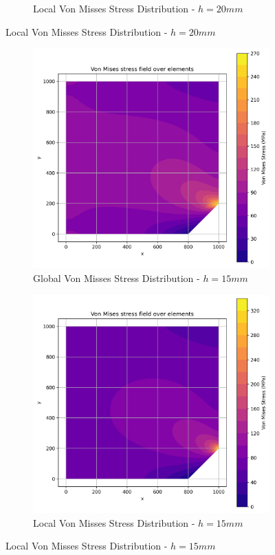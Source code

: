 \begin{figure}[H]
\begin{subfigure}[b]{0.45\textwidth}
    \caption{Local Von Misses Stress Distribution - $h=20mm$}
    \label{fig:img2}
  \end{subfigure}
\end{figure}

\begin{figure}[H]
  \centering
  \begin{subfigure}[b]{0.45\textwidth}
    \centering
    \includegraphics[width=\textwidth]{GRAFICOS/Quad4/1.75mm_global/resultados_von_mises.png}
    \caption{Global Von Misses Stress Distribution - $h=15mm$}
    \label{fig:img11}
  \end{subfigure}
  \hfill
  \begin{subfigure}[b]{0.45\textwidth}
    \centering
    \includegraphics[width=\textwidth]{GRAFICOS/Quad4/1.75mm_local/resultados_von_mises.png}
    \caption{Local Von Misses Stress Distribution - $h=15mm$}
    \label{fig:img21}
  \end{subfigure}
\end{figure}

